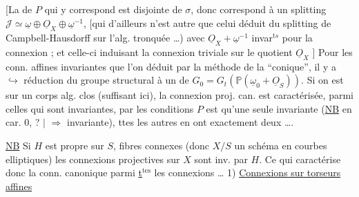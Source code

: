 [La  de $P$ qui y correspond est
 disjointe de $\sigma$, donc correspond à
un splitting  $\mathscr J\simeq\underline\omega\oplus\underline O_X\oplus\underline\omega^{-1}$,
[qui d'ailleurs n'est autre que celui
déduit du splitting de Campbell-Hausdorff
sur l'alg. tronquée \ldots) avec $\underline O_X+\underline\omega^{-1}$  invar$^{\mathrm ts}$
pour la connexion ; et celle-ci induisant
la connexion  triviale sur le
quotient $\underline O_X$ \unsure{\ldots}] Pour les conn. affines
invariantes que l'on déduit par
la méthode de la ``conique'', il
y a $\hookrightarrow$ réduction  du groupe structural 
à un    de $G_0=G_t(\mathbb P(\underline\omega_0+\underline O_S))$.
Si on est sur un corps alg. clos (suffisant ici), 
la connexion proj. can. est caractérisée, parmi
celles qui sont invariantes, par les conditions
 $P$ est  qu'une seule 
 invariante (\uline{NB} en car. $0$, 
? $\mid$ $\Rightarrow$ invariante), ttes les autres en
ont exactement deux \ldots.

\uline{NB} Si $H$ est propre sur $S$, fibres connexes (donc
$X/S$ un schéma en courbes elliptiques)
\uline{} les connexions projectives sur $X$
sont inv. par $H$. Ce qui caractérise donc
la conn.  canonique parmi \uline{t$^{\mathrm{tes}}$}
les connexions \ldots
1) \uline{Connexions sur torseurs affines}

